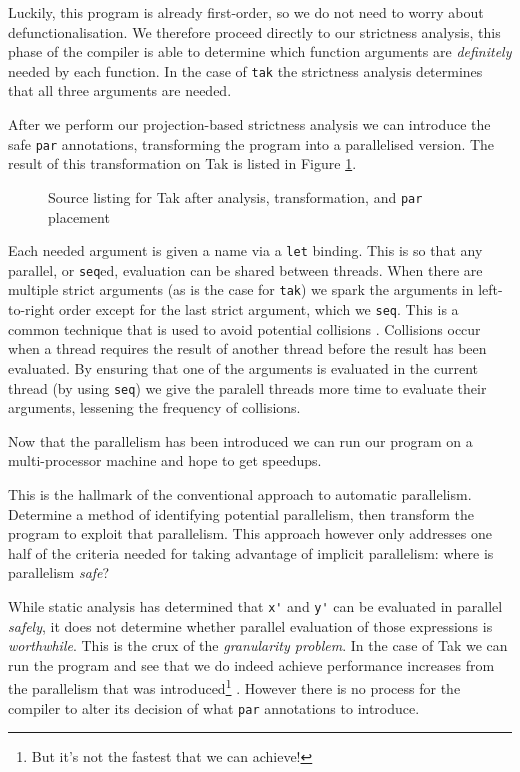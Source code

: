 Luckily, this program is already first-order, so we do not need to worry
about defunctionalisation. We therefore proceed directly to our strictness
analysis, this phase of the compiler is able to determine which function
arguments are \emph{definitely} needed by each function. In the case of
\verb|tak| the strictness analysis determines that all three arguments
are needed. 

After we perform our projection-based strictness analysis we can introduce the
safe \verb-par- annotations, transforming the program into a parallelised
version. The result of this transformation on Tak is listed in Figure
\ref{fig:takParred}.

\begin{figure}[!h]
  
\caption{Source listing for Tak after analysis, transformation, and \texttt{par} placement}
\label{fig:takParred}
\end{figure}

Each needed  argument is given a name via a \verb-let- binding. This is so that any
parallel, or \verb-seq-ed, evaluation can be shared between threads. When there
are multiple strict arguments (as is the case for \verb-tak-) we spark the
arguments in left-to-right order except for the last strict argument, which we
\verb-seq-. This is a common technique that is used to avoid potential
collisions \citep{strategies}. Collisions occur when a thread requires the
result of another thread before the result has been evaluated. By ensuring that
one of the arguments is evaluated in the current thread (by using \texttt{seq})
we give the paralell threads more time to evaluate their arguments, lessening
the frequency of collisions.

Now that the parallelism has been introduced we can run our program on a multi-processor
machine and hope to get speedups.


This is the hallmark of the conventional approach to automatic parallelism.
Determine a method of identifying potential parallelism, then transform the
program to exploit that parallelism. This approach however only addresses one
half of the criteria needed for taking advantage of implicit parallelism: where
is parallelism \emph{safe}?

While static analysis has determined that \verb-x'- and \verb-y'- can be
evaluated in parallel \emph{safely}, it does not determine whether parallel
evaluation of those expressions is \emph{worthwhile}. This is the crux of the
\emph{granularity problem}. In the case of Tak we can run the program and see
that we do indeed achieve performance increases from the parallelism that was
introduced\footnote{But it's not the fastest that we can achieve!} . However there is no process for the compiler to alter its
decision of what \verb|par| annotations to introduce.

